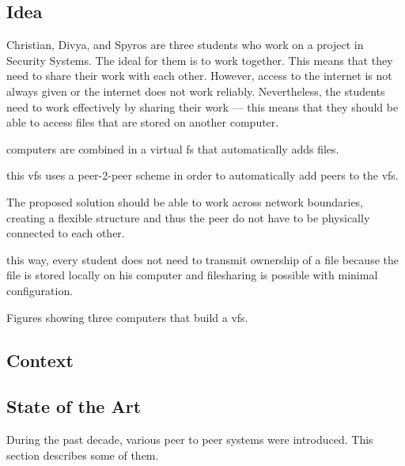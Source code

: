 
\subsection{Idea}

Christian, Divya, and Spyros are three students who work on a project in Security Systems. The ideal for them is to work together. This means that they need to share their work with each other. However, access to the internet is not always given or the internet does not work reliably. Nevertheless, the students need to work effectively by sharing their work --- this means that they should be able to access files that are stored on another computer.

computers are combined in a virtual fs that automatically adds files.

this vfs uses a peer-2-peer scheme in order to automatically add peers to the vfs. 

The proposed solution should be able to work across network boundaries, creating a flexible structure and thus the peer do not have to be physically connected to each other. 

this way, every student does not need to transmit ownership of a file because the file is stored locally on his computer and filesharing is possible with minimal configuration. 



Figures showing three computers that build a vfs.


\subsection{Context}

\subsection{State of the Art}

During the past decade, various peer to peer systems were introduced. This section describes some of them.

